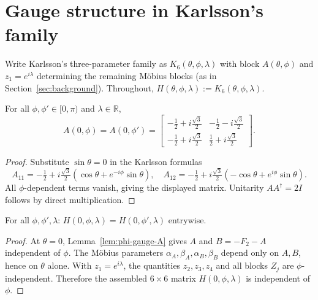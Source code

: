 
\section{Gauge structure in Karlsson's family}
\label{sec:proof-gauge}

Write Karlsson's three-parameter family as $K_6(\theta,\phi,\lambda)$ with block $A(\theta,\phi)$ and $z_1=e^{i\lambda}$ determining the remaining M\"obius blocks (as in Section~\ref{sec:background}).
Throughout, $H(\theta,\phi,\lambda):=K_6(\theta,\phi,\lambda)$.

\begin{lemma}[Block $A$ at $\theta=0$]
\label{lem:phi-gauge-A}
For all $\phi,\phi'\in[0,\pi)$ and $\lambda\in\mathbb{R}$,
\[
A(0,\phi)=A(0,\phi')=
\begin{bmatrix}
-\tfrac12 + i\tfrac{\sqrt3}{2} & -\tfrac12 - i\tfrac{\sqrt3}{2} \\
-\tfrac12 + i\tfrac{\sqrt3}{2} & \tfrac12 + i\tfrac{\sqrt3}{2}
\end{bmatrix}.
\]
\end{lemma}

\begin{proof}
Substitute $\sin\theta=0$ in the Karlsson formulas
\[
A_{11}=-\tfrac12 + i\tfrac{\sqrt3}{2}(\cos\theta+e^{-i\phi}\sin\theta),\quad
A_{12}=-\tfrac12 + i\tfrac{\sqrt3}{2}(-\cos\theta+e^{i\phi}\sin\theta).
\]
All $\phi$-dependent terms vanish, giving the displayed matrix.
Unitarity $AA^\dagger=2I$ follows by direct multiplication.
\end{proof}

\begin{lemma}[$\phi$-gauge for $H$ at $\theta=0$]
\label{lem:L1}
For all $\phi,\phi',\lambda$: $H(0,\phi,\lambda)=H(0,\phi',\lambda)$ entrywise.
\end{lemma}

\begin{proof}
At $\theta=0$, Lemma~\ref{lem:phi-gauge-A} gives $A$ and $B=-F_2-A$ independent of $\phi$.
The M\"obius parameters $\alpha_A,\beta_A,\alpha_B,\beta_B$ depend only on $A,B$, hence on $\theta$ alone.
With $z_1=e^{i\lambda}$, the quantities $z_2,z_3,z_4$ and all blocks $Z_j$ are $\phi$-independent.
Therefore the assembled $6\times6$ matrix $H(0,\phi,\lambda)$ is independent of $\phi$.
\end{proof}

